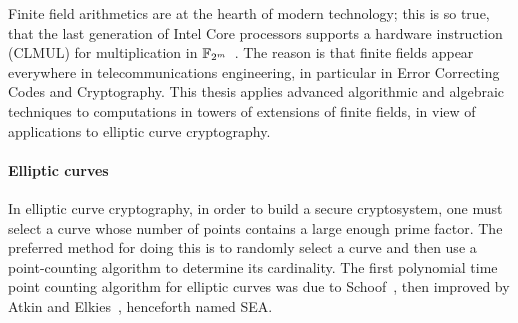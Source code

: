 





Finite field arithmetics are at the hearth of modern technology; this
is so true, that the last generation of Intel Core processors supports
a hardware instruction (CLMUL) for multiplication in
$\mathbb{F}_{2^m}$~\cite{intel-carryless}. The reason is that finite fields
appear everywhere in telecommunications engineering, in particular in
Error Correcting Codes and Cryptography. This thesis applies advanced
algorithmic and algebraic techniques to computations in towers of
extensions of finite fields, in view of applications to elliptic curve
cryptography.


\paragraph*{Elliptic curves}
In elliptic curve cryptography, in order to build a secure
cryptosystem, one must select a curve whose number of points contains
a large enough prime factor. The preferred method for doing this is to
randomly select a curve and then use a point-counting algorithm to
determine its cardinality. The first polynomial time point counting
algorithm for elliptic curves was due to Schoof~\cite{schoof85}, then
improved by Atkin and
Elkies~\cite{atkin88,elkies92,elkies98,schoof95}, henceforth named
SEA.


